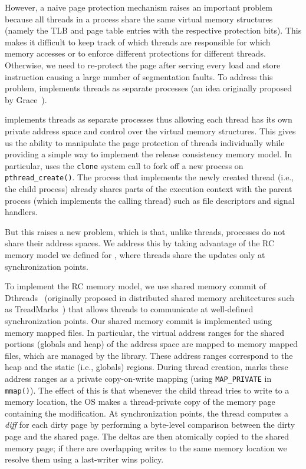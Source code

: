 However, a naive page protection mechanism raises an important problem because all threads in a process share the same virtual memory
structures (namely the TLB and page table entries with the respective protection bits). This makes it difficult to keep track of which
threads are responsible for which memory accesses or to enforce different protections for different threads. Otherwise, we need to re-protect the page after serving every load and store instruction causing a large number of segmentation faults.
To address this problem, \projecttitle implements threads as separate
processes (an idea originally proposed by Grace~\cite{grace-oopsla-2009}).

 \projecttitle  implements threads as separate processes thus allowing each thread has its own private address space and control over the virtual
memory structures.   This gives us the ability to manipulate the page protection of threads individually while providing a simple way to implement the release consistency memory
model. In particular, \projecttitle uses the {\tt clone} system call to fork off a new process on {\tt pthread\_create()}. The process that implements the newly created thread (i.e., the child process) already
shares parts of the execution context with the parent process (which implements the calling thread) such as file descriptors and signal handlers. 


But this raises a new problem, which is that, unlike threads, processes do not share their address spaces. We address this by taking advantage of the RC memory model we defined for \projecttitle, where threads share the updates only at synchronization points.  

 To implement the RC memory model, we use shared memory commit of  Dthreads~\cite{dthreads-sosp-2011} (originally proposed in distributed shared memory architectures such as TreadMarks~\cite{treadmark}) %
that allows threads to communicate at well-defined synchronization points.
Our shared memory commit is implemented using memory mapped files. In
particular, the virtual address ranges for the shared portions (globals and heap) of
the address space are mapped to memory mapped files, which are managed by the
\projecttitle library. These address ranges correspond to the heap and
the static (i.e., globals) regions.  During thread creation,
\projecttitle marks these address ranges as a private copy-on-write
mapping (using {\tt MAP\_PRIVATE} in {\tt mmap()}). The effect of this
is that whenever the child thread tries to write to a memory location,
the OS makes a thread-private copy of the memory page containing the
modification.  At synchronization points, the thread computes a {\em diff}
for each dirty page by performing a byte-level comparison between the
dirty page and the shared page. The deltas are then atomically
copied to the shared memory page; if there are overlapping writes
to the same memory location we resolve them using a last-writer wins policy.


